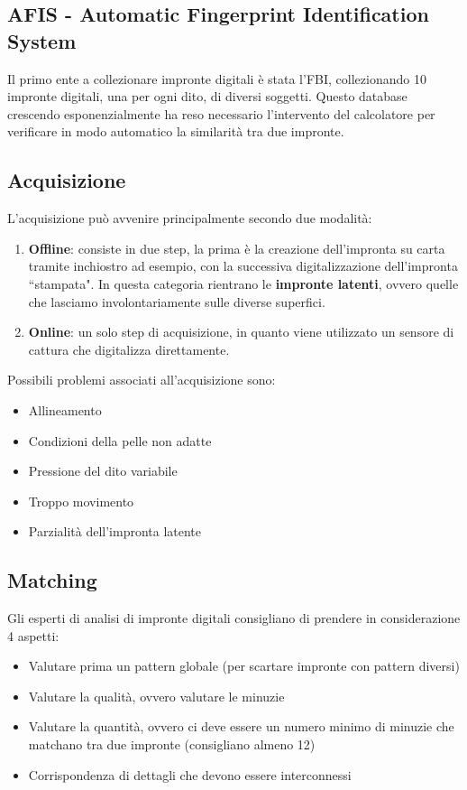 \documentclass{article}
\begin{document}
\subsection{AFIS - Automatic Fingerprint Identification System}
Il primo ente a collezionare impronte digitali è stata l'FBI, collezionando 10 impronte digitali, una per ogni dito, di diversi soggetti. Questo database crescendo esponenzialmente ha reso necessario l'intervento del calcolatore per verificare in modo automatico la similarità tra due impronte.

\subsection{Acquisizione}
L'acquisizione può avvenire principalmente secondo due modalità:
\begin{enumerate}
    \item \textbf{Offline}: consiste in due step, la prima è la creazione dell'impronta su carta tramite inchiostro ad esempio, con la successiva digitalizzazione dell'impronta ``stampata". In questa categoria rientrano le \textbf{impronte latenti}, ovvero quelle che lasciamo involontariamente sulle diverse superfici.
    \item \textbf{Online}: un solo step di acquisizione, in quanto viene utilizzato un sensore di cattura che digitalizza direttamente.
\end{enumerate}

Possibili problemi associati all'acquisizione sono:
\begin{itemize}
    \item Allineamento
    \item Condizioni della pelle non adatte
    \item Pressione del dito variabile
    \item Troppo movimento
    \item Parzialità dell'impronta latente
\end{itemize}

\subsection{Matching}
Gli esperti di analisi di impronte digitali consigliano di prendere in considerazione 4 aspetti:
\begin{itemize}
    \item Valutare prima un pattern globale (per scartare impronte con pattern diversi)
    \item Valutare la qualità, ovvero valutare le minuzie
    \item Valutare la quantità, ovvero ci deve essere un numero minimo di minuzie che matchano tra due impronte (consigliano almeno 12)
    \item Corrispondenza di dettagli che devono essere interconnessi
\end{itemize}
\end{document}
